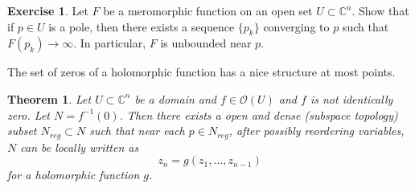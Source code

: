 \documentclass[12pt,openany]{book}
\newcommand{\C}{{\mathbb{C}}}
\newcommand{\sO}{{\mathscr{O}}}
\theoremstyle{plain}
\newtheorem{thm}{Theorem}[section]
\theoremstyle{remark}
\theoremstyle{definition}
\newenvironment{exbox}{%
    \def\FrameCommand{\vrule width 1pt \relax\hspace{10pt}}%
    \MakeFramed {\advance \hsize -\width \FrameRestore}%
}{%
    \endMakeFramed
}
\theoremstyle{exercise}
\newtheorem{exercise}{Exercise}[section]
\theoremstyle{example}
\begin{document}
\begin{exbox}
\begin{exercise}
Let $F$ be a meromorphic function on an open set $U \subset \C^n$.  Show
that if $p \in U$ is a pole, then there exists a sequence $\{ p_k \}$
converging to $p$ such that $F(p_k) \to \infty$.  In particular, $F$ is
unbounded near $p$.
\end{exercise}
\end{exbox}

The set of zeros of a holomorphic function has a nice structure at most
points.

\begin{thm} \label{thm:regptsdense}
Let $U \subset \C^n$ be a domain and
$f \in \sO(U)$ and $f$ is not identically zero.
Let $N = f^{-1}(0)$.  Then there exists a open and dense (subspace topology) subset
$N_{\mathit{reg}} \subset N$
such that near each $p \in N_{\mathit{reg}}$, after possibly reordering variables,
$N$ can be locally written as
\begin{equation*}
z_n = g(z_1,\ldots,z_{n-1})
\end{equation*}
for a holomorphic function $g$.
\end{thm}
\end{document}
